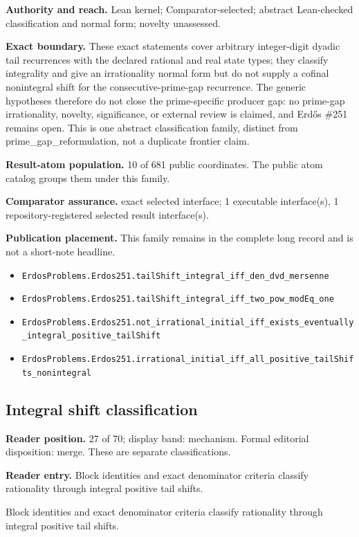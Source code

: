 \documentclass[11pt]{article}
\begin{document}
\textbf{Authority and reach.} Lean kernel; Comparator-selected; abstract Lean-checked classification and normal form; novelty unassessed.

\textbf{Exact boundary.} These exact statements cover arbitrary integer-digit dyadic tail recurrences with the declared rational and real state types; they classify integrality and give an irrationality normal form but do not supply a cofinal nonintegral shift for the consecutive-prime-gap recurrence. The generic hypotheses therefore do not close the prime-specific producer gap: no prime-gap irrationality, novelty, significance, or external review is claimed, and Erdős \#251 remains open. This is one abstract classification family, distinct from prime\_gap\_reformulation, not a duplicate frontier claim.

\textbf{Result-atom population.} 10 of 681 public coordinates. The public atom catalog groups them under this family.

\textbf{Comparator assurance.} exact selected interface; 1 executable interface(s), 1 repository-registered selected result interface(s).

\textbf{Publication placement.} This family remains in the complete long record and is not a short-note headline.

\begin{itemize}
  \item \nolinkurl{ErdosProblems.Erdos251.tailShift_integral_iff_den_dvd_mersenne}
  \item \nolinkurl{ErdosProblems.Erdos251.tailShift_integral_iff_two_pow_modEq_one}
  \item \nolinkurl{ErdosProblems.Erdos251.not_irrational_initial_iff_exists_eventually_integral_positive_tailShift}
  \item \nolinkurl{ErdosProblems.Erdos251.irrational_initial_iff_all_positive_tailShifts_nonintegral}
\end{itemize}

\subsection{Integral shift classification}
\textbf{Reader position.} 27 of 70; display band: mechanism.  Formal editorial disposition: merge.  These are separate classifications.

\textbf{Reader entry.} Block identities and exact denominator criteria classify rationality through integral positive tail shifts.

Block identities and exact denominator criteria classify rationality through integral positive tail shifts.
\end{document}
